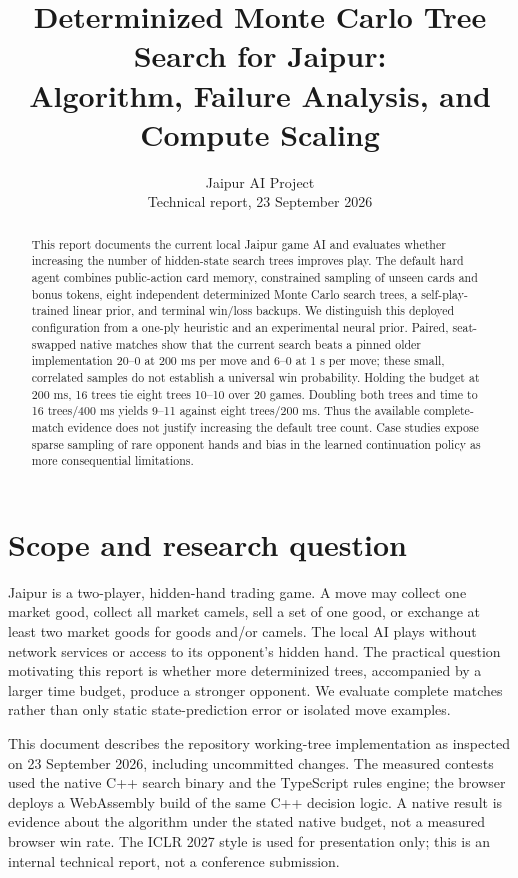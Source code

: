 \documentclass{article}
\title{Determinized Monte Carlo Tree Search for Jaipur:\\
Algorithm, Failure Analysis, and Compute Scaling}
\author{Jaipur AI Project\\Technical report, 23 September 2026}
\begin{document}
\maketitle
\fancyhead{}
\rhead{}

\begin{abstract}
This report documents the current local Jaipur game AI and evaluates whether increasing the number of hidden-state search trees improves play. The default hard agent combines public-action card memory, constrained sampling of unseen cards and bonus tokens, eight independent determinized Monte Carlo search trees, a self-play-trained linear prior, and terminal win/loss backups. We distinguish this deployed configuration from a one-ply heuristic and an experimental neural prior. Paired, seat-swapped native matches show that the current search beats a pinned older implementation 20--0 at 200 ms per move and 6--0 at 1 s per move; these small, correlated samples do not establish a universal win probability. Holding the budget at 200 ms, 16 trees tie eight trees 10--10 over 20 games. Doubling both trees and time to 16 trees/400 ms yields 9--11 against eight trees/200 ms. Thus the available complete-match evidence does not justify increasing the default tree count. Case studies expose sparse sampling of rare opponent hands and bias in the learned continuation policy as more consequential limitations.
\end{abstract}

\section{Scope and research question}

Jaipur is a two-player, hidden-hand trading game. A move may collect one market good, collect all market camels, sell a set of one good, or exchange at least two market goods for goods and/or camels. The local AI plays without network services or access to its opponent's hidden hand. The practical question motivating this report is whether more determinized trees, accompanied by a larger time budget, produce a stronger opponent. We evaluate complete matches rather than only static state-prediction error or isolated move examples.

This document describes the repository working-tree implementation as inspected on 23 September 2026, including uncommitted changes. The measured contests used the native C++ search binary and the TypeScript rules engine; the browser deploys a WebAssembly build of the same C++ decision logic. A native result is evidence about the algorithm under the stated native budget, not a measured browser win rate. The ICLR 2027 style is used for presentation only; this is an internal technical report, not a conference submission.
\end{document}
